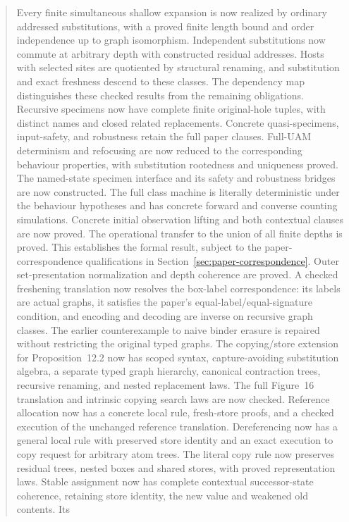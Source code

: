 \documentclass[11pt,a4paper]{article}
\theoremstyle{definition}
\theoremstyle{plain}
\theoremstyle{remark}
\begin{document}
\begin{abstract}
Every finite simultaneous shallow expansion is now realized by ordinary addressed substitutions, with a proved finite length bound and order independence up to graph isomorphism. Independent substitutions now commute at arbitrary depth with constructed residual addresses. Hosts with selected sites are quotiented by structural renaming, and substitution and exact freshness descend to these classes. The dependency map distinguishes these checked results from the remaining obligations. Recursive specimens now have complete finite original-hole tuples, with distinct names and closed related replacements. Concrete quasi-specimens, input-safety, and robustness retain the full paper clauses. Full-UAM determinism and refocusing are now reduced to the corresponding behaviour properties, with substitution rootedness and uniqueness proved. The named-state specimen interface and its safety and robustness bridges are now constructed. The full class machine is literally deterministic under the behaviour hypotheses and has concrete forward and converse counting simulations. Concrete initial observation lifting and both contextual clauses are now proved. The operational transfer to the union of all finite depths is proved. This establishes the formal result, subject to the paper-correspondence qualifications in Section~\ref{sec:paper-correspondence}.
Outer set-presentation normalization and depth coherence are proved. A checked
freshening translation now resolves the box-label correspondence: its labels are
actual graphs, it satisfies the paper's equal-label/equal-signature condition,
and encoding and decoding are inverse on recursive graph classes. The earlier
counterexample to naive binder erasure is repaired without restricting the
original typed graphs.
The copying/store extension for Proposition~12.2 now has scoped syntax,
capture-avoiding substitution algebra, a separate typed graph hierarchy,
canonical contraction trees, recursive renaming, and nested replacement laws.
The full Figure~16 translation and intrinsic copying search laws are now checked.
Reference allocation now has a concrete local rule, fresh-store proofs, and
a checked execution of the unchanged reference translation. Dereferencing now has
a general local rule with preserved store identity and an exact execution to
copy request for arbitrary atom trees. The literal copy rule now preserves
residual trees, nested boxes and shared stores, with proved representation laws.
Stable assignment now has complete contextual successor-state coherence,
retaining store identity, the new value and weakened old contents. Its

\end{abstract}
\end{document}
